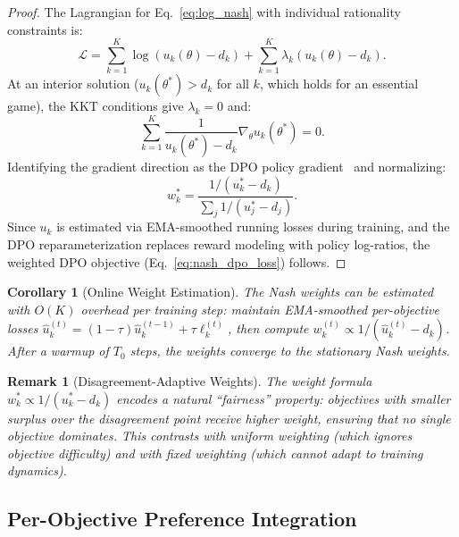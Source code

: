 \documentclass{article}
\newtheorem{corollary}{Corollary}
\newtheorem{remark}{Remark}
\begin{document}
\begin{proof}
The Lagrangian for Eq.~\eqref{eq:log_nash} with individual rationality constraints is:
\begin{equation}
\mathcal{L} = \sum_{k=1}^K \log(u_k(\theta) - d_k) + \sum_{k=1}^K \lambda_k (u_k(\theta) - d_k).
\end{equation}
At an interior solution ($u_k(\theta^*) > d_k$ for all $k$, which holds for an essential game), the KKT conditions give $\lambda_k = 0$ and:
\begin{equation}
\sum_{k=1}^K \frac{1}{u_k(\theta^*) - d_k} \nabla_\theta u_k(\theta^*) = 0.
\end{equation}
Identifying the gradient direction as the DPO policy gradient~\citep{rafailov2024direct} and normalizing:
\begin{equation}
w_k^* = \frac{1/(u_k^* - d_k)}{\sum_j 1/(u_j^* - d_j)}.
\end{equation}
Since $u_k$ is estimated via EMA-smoothed running losses during training, and the DPO reparameterization replaces reward modeling with policy log-ratios, the weighted DPO objective (Eq.~\ref{eq:nash_dpo_loss}) follows.
\end{proof}

\begin{corollary}[Online Weight Estimation]
\label{cor:online}
The Nash weights can be estimated with $O(K)$ overhead per training step:
maintain EMA-smoothed per-objective losses $\hat{u}_k^{(t)} = (1-\tau)\hat{u}_k^{(t-1)} + \tau \ell_k^{(t)}$, then compute $w_k^{(t)} \propto 1/(\hat{u}_k^{(t)} - d_k)$.
After a warmup of $T_0$ steps, the weights converge to the stationary Nash weights.
\end{corollary}

\begin{remark}[Disagreement-Adaptive Weights]
\label{rem:adaptive}
The weight formula $w_k^* \propto 1/(u_k^* - d_k)$ encodes a natural ``fairness'' property: objectives with smaller surplus over the disagreement point receive higher weight, ensuring that no single objective dominates.
This contrasts with uniform weighting (which ignores objective difficulty) and with fixed weighting (which cannot adapt to training dynamics).
\end{remark}


\subsection{Per-Objective Preference Integration}
\label{sec:per_obj}
\end{document}
